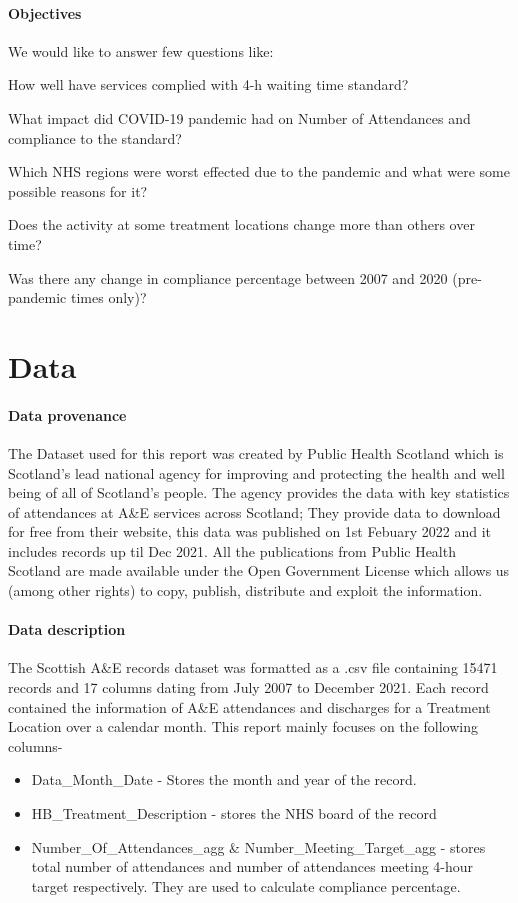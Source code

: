 \documentclass[11pt,a4paper]{article}
\begin{document}
\paragraph{Objectives}

We would like to answer few questions like: 

How well have services complied with 4-h waiting time standard?

What impact did COVID-19 pandemic had on Number of Attendances and compliance to the standard?

Which NHS regions were worst effected due to the pandemic and what were some possible reasons for it?

Does the activity at some treatment locations change more than others over time?

Was there any change in compliance percentage between 2007 and 2020 (pre-pandemic times only)?

\section{Data}

\paragraph{Data provenance} 

The Dataset used for this report was created by Public Health Scotland\cite{PHS} which is Scotland's lead national agency for improving and protecting the health and well being of all of Scotland’s people. The agency provides the data with key statistics of attendances at A\&E services across Scotland; They provide data to download for free from their website\cite{waiting_time_publication}, this data was published on 1st Febuary 2022 and it includes records up til Dec 2021. All the publications from Public Health Scotland are made available under the Open Government License \cite{open_government_licence} \cite{permission} which allows us (among other rights) to copy, publish, distribute and exploit the information.


\paragraph{Data description} 

The Scottish A\&E records dataset was formatted as a .csv file containing 15471 records and 17 columns dating from July 2007 to December 2021. Each record contained the information of A\&E attendances and discharges for a Treatment Location over a calendar month. 
This report mainly focuses on the following columns-
\begin{itemize}
    \item Data\_Month\_Date - Stores the month and year of the record.
    \item HB\_Treatment\_Description - stores the NHS board of the record
    \item Number\_Of\_Attendances\_agg \& Number\_Meeting\_Target\_agg - stores total number of attendances and number of attendances meeting 4-hour target respectively. They are used to calculate compliance percentage.
\end{itemize}
\end{document}
